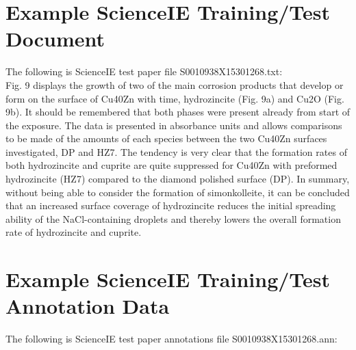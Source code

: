\begin{appendices}
\appendix

\chapter{Example ScienceIE Training/Test Document}
\label{appendix:egpaper}
The following is ScienceIE test paper file S0010938X15301268.txt:\\

\noindent Fig. 9 displays the growth of two of the main corrosion products that develop or form on the surface of Cu40Zn with time, hydrozincite (Fig. 9a) and Cu2O (Fig. 9b). It should be remembered that both phases were present already from start of the exposure. The data is presented in absorbance units and allows comparisons to be made of the amounts of each species between the two Cu40Zn surfaces investigated, DP and HZ7. The tendency is very clear that the formation rates of both hydrozincite and cuprite are quite suppressed for Cu40Zn with preformed hydrozincite (HZ7) compared to the diamond polished surface (DP). In summary, without being able to consider the formation of simonkolleite, it can be concluded that an increased surface coverage of hydrozincite reduces the initial spreading ability of the NaCl-containing droplets and thereby lowers the overall formation rate of hydrozincite and cuprite.

\chapter{Example ScienceIE Training/Test Annotation Data}
\label{appendix:egann}
The following is ScienceIE test paper annotations file S0010938X15301268.ann:\\


\end{appendices}
